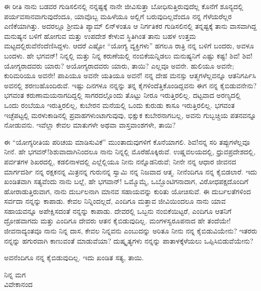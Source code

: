 ಈ ರೀತಿ ನಾನು ಬಡವರ ಗುಡಿಸಲಿನಲ್ಲಿ ನನ್ನಷ್ಟಕ್ಕೆ ನಾನೇ ಜೀವಿಸುತ್ತಾ ಬೋಧಿಸುತ್ತಿರುವುದೆಲ್ಲ ಕೊನೆಗೆ ಶೂನ್ಯದಲ್ಲಿ ಪರ್ಯವಸಾನವಾಗುವುದೆಂದೂ, ಯಾವೊಬ್ಬ ಮಹಿಳೆಯೂ ಅಲ್ಲಿಗೆ ಬರುವುದಿಲ್ಲವೆಂದೂ ನನ್ನ ಗೆಳೆಯರೆಲ್ಲರ ಎಣಿಕೆಯಾಗಿತ್ತು. ಅದರಲ್ಲೂ ಶ‍್ರೀಮತಿ ಪ್ಯಾಮ್ ಲಿನ್‌ಳಂತೂ ಆ ನಿರ್ಗತಿಕರ ಗುಡಿಸಲಿನಲ್ಲಿ ತನ್ನಷ್ಟಕ್ಕೆ ತಾನು ವಾಸವಾಗಿದ್ದ ಮನುಷ್ಯನ ಬಳಿಗೆ ಹೋಗುವ ಮತ್ತು ಉಪದೇಶ ಕೇಳುವ ಸ್ಥಿತಿಗಿಂತ ತಾನು ಬಹಳ ಉತ್ತಮ ಮಟ್ಟದಲ್ಲಿರುವೆನೆಂದೆಣಿಸಿದ್ದಳು. ಆದರೆ ಎಷ್ಟೋ “ಯೋಗ್ಯ ವ್ಯಕ್ತಿಗಳು” ಹಗಲೂ ರಾತ್ರಿ ನನ್ನ ಬಳಿಗೆ ಬಂದರು, ಅವಳೂ ಬಂದಳು. ಹೇ ಭಗವನ್! ನಿನ್ನಲ್ಲಿ ಮತ್ತು ನಿನ್ನ ಕರುಣೆಯಲ್ಲಿ ನಂಬಿಕೆಯನ್ನಿಡಲು ಮನುಷ್ಯನಿಗೆ ಎಷ್ಟು ಕಷ್ಟ! ಶಿವ! ಶಿವ! ಯೋಗ್ಯರಾದವರು ಯಾರು? ಅಯೋಗ್ಯರಾದವರು ಯಾರು, ತಾಯಿ? ಎಲ್ಲವೂ ಅವನೇ. ಹುಲಿಯೂ ಅವನೇ; ಕುರಿಮರಿಯೂ ಅವನೇ! ಪಾಪಿಯೂ ಅವನೇ ಯತಿಯೂ ಅವನೆ! ನನ್ನ ದೇಹ ಮನಸ್ಸು ಆತ್ಮಗಳೆಲ್ಲವನ್ನೂ ಆತನಿಗರ್ಪಿಸಿ ಅವನಲ್ಲಿ ಶರಣುಹೊಂದಿರುವೆ. ಇಷ್ಟು ದಿನಗಳೂ ನನ್ನನ್ನು ತನ್ನ ಕೈಗಳಿಂದೆತ್ತಿಕೊಂಡಿದ್ದವನು ಈಗ ನನ್ನ ಕೈಬಿಡುವನೇನು? ಭಗವಂತ ಕರುಣಾಮಯನಾಗದಿದ್ದಲ್ಲಿ ಸಾಗರದಲ್ಲೊಂದು ತೊಟ್ಟು ನೀರೂ ಇರುತ್ತಿರಲಿಲ್ಲ. ದಟ್ಟವಾದ ಅರಣ್ಯದಲ್ಲಿ ಒಂದು ರಂಬೆಯೂ ಇರುತ್ತಿರಲಿಲ್ಲ, ಕುಬೇರನ ಮನೆಯಲ್ಲಿ ಒಂದು ಕುರುಡು ಕಾಸೂ ಇರುತ್ತಿರಲಿಲ್ಲ. ಭಗವಂತ ಇಚ್ಛೆಪಟ್ಟಲ್ಲಿ ಮರಳುಕಾಡಿನಲ್ಲಿ ಪ್ರವಾಹಗಳುಂಟಾಗುವುವು, ಭಿಕ್ಷುಕ ಕುಬೇರನಾಗಬಲ್ಲ, 
ಅವನು ಗುಬ್ಬಚ್ಚಿಯ ಪತನವನ್ನೂ ನೋಡುವನು. ಇವೆಲ್ಲಾ ಕೇವಲ ಮಾತುಗಳೇ ಅಥವಾ ವಾಸ್ತವಾಂಶಗಳೇ, ತಾಯಿ?

\vspace{0.15cm}

ಈ “ಯೋಗ್ಯರೀತಿಯ ಪರಿಚಯ ಮಾಡಿಸುವಿಕೆ” ಮುಂತಾದುವುಗಳಿಗೆ ಕೊನೆಯಾಗಲಿ. ಶಿವ!ನನ್ನ ಸರಿ ತಪ್ಪುಗಳೆಲ್ಲವೂ ನೀನೆ. ಹೇ ಭಗವನ್!ಶಿಶುವಾದಾಗಿನಿಂದಲೂ ನಾನು ನಿನ್ನಲ್ಲಿ ಮೊರೆಹೊಕ್ಕಿರುವೆ. ಉಷ್ಣವಲಯದಲ್ಲಿ, ಧ್ರುವಪ್ರದೇಶದಲ್ಲಿ, ಪರ್ವತಗಳ ಶಿಖರದಲ್ಲಿ, ಕಡಲಿನಾಳದಲ್ಲಿ ಎಲ್ಲೆಲ್ಲಿಯೂ ನೀನು ನನ್ನೊಡನಿರುವೆ; ನೀನೇ ನನ್ನ ಆಧಾರ\enginline{-} ಜೀವನದ\enginline{-} ಮಾರ್ಗದರ್ಶಿ\enginline{-} ನನ್ನ ರಕ್ಷಕ\enginline{-}ನನ್ನ ಮಿತ್ರ\enginline{-}ನನ್ನ ಗುರು\enginline{-}ನನ್ನ ಸ್ವಾಮಿ\enginline{-} ನನ್ನ ನಿಜವಾದ ಆತ್ಮ. ನೀನೆಂದಿಗೂ ನನ್ನ ಕೈಬಿಡಲಾರೆ. ಇದು ಖಂಡಿತವಾಗಿ ಸತ್ಯವೆಂದು ನಾನು ಬಲ್ಲೆ, ಹೇ ಭಗವಾನ್! ಒಮ್ಮೊಮ್ಮೆ, ಒಬ್ಬೊಂಟಿಗನಾದಾಗ, ವಿರೋಧಪಕ್ಷದೊಂದಿಗೆ ಹೋರಾಡುತ್ತಿರುವಾಗ, ನಾನು ದುರ್ಬಲನಾಗಿ ಮಾನವ ಸಹಾಯವನ್ನು ಕುರಿತು ಯೋಚಿಸುವೆ. ಈ ದುರ್ಬಲತೆಗಳಿಂದ ಸರ್ವದಾ ನನ್ನನ್ನು ಕಾಪಾಡು. ಕೇವಲ ನಿನ್ನಿಂದಲ್ಲದೆ, ಎಂದಿಗೂ ಮತ್ತಾವ ಜೀವಿಯಿಂದಲೂ ನಾನು ಯಾವ ಸಹಾಯವನ್ನೂ ಅಪೇಕ್ಷಿಸದಂತೆ ನನ್ನನ್ನು ಕಾಪಾಡು. ದೇವರಲ್ಲಿ ಒಬ್ಬನು ನಂಬಿಕೆಯಿಟ್ಟರೆ, ಎಂದಿಗೂ ಆತನಿಗೆ ದ್ರೋಹವಾಗದು ಮತ್ತು ಎಂದಿಗೂ ದೇವರು ಆತನ ಕೈಬಿಡುವುದಿಲ್ಲ. ಮಂಗಳಸ್ವರೂಪನಾದ ಹೇ ತಂದೆಯೇ! ಜೀವನಾದ್ಯಂತವೂ ನಾನು ನಿನ್ನ ದಾಸ, ಕೇವಲ ನಿನ್ನವನು ಎಂಬುದನ್ನು ಅರಿತೂ ನೀನು ನನ್ನ ಕೈಬಿಡುವಿಯೇನು? ಇತರರು ನನ್ನನ್ನು ಹಗುರವಾಗಿ ಕಾಣುವಂತೆ ಮಾಡುವೆಯಾ? ದುಷ್ಕೃತ್ಯಗಳು ನನ್ನನ್ನು ಪಾತಾಳಕ್ಕೆಳೆಯಲು ಒಪ್ಪಿಸಿಬಿಡುವೆಯೇನು?

\vspace{0.15cm}

ಅವನೆಂದಿಗೂ ನನ್ನ ಕೈಬಿಡುವುದಿಲ್ಲ. ಇದು ಖಂಡಿತ ಸತ್ಯ, ತಾಯಿ.

{\flushright
ನಿನ್ನ ಮಗ\\ವಿವೇಕಾನಂದ\par}

